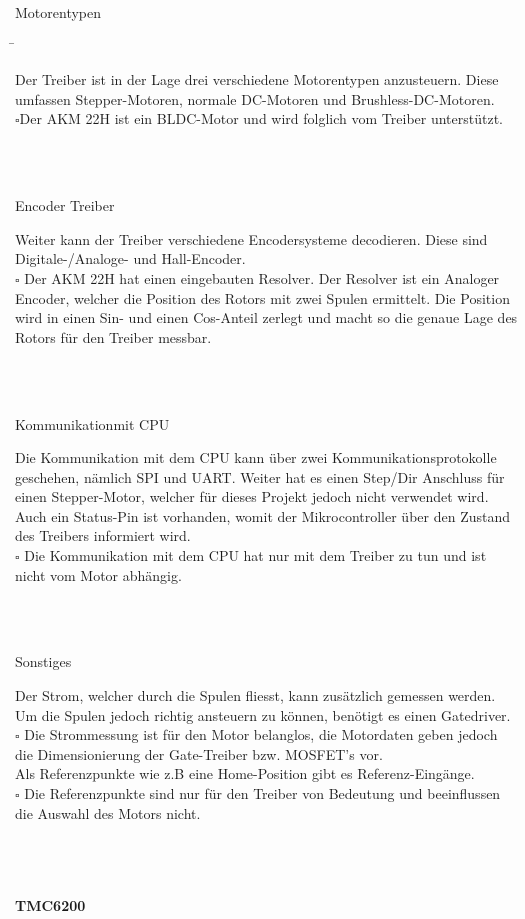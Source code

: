 \begin{tabbing}
\parbox[t]{.25\textwidth}{Motorentypen} \= \parbox[t]{.75\textwidth}{\textbullet Der Treiber ist in der Lage drei verschiedene Motorentypen anzusteuern.
Diese umfassen Stepper-Motoren, normale DC-Motoren und Brushless-DC-Motoren.\\

$\square$Der AKM 22H ist ein BLDC-Motor und wird folglich vom Treiber unterstützt.}\\
\\
\parbox[t]{.25\textwidth}{Encoder Treiber} \> \parbox[t]{.75\textwidth}{\textbullet Weiter kann der  Treiber verschiedene Encodersysteme decodieren.
Diese sind Digitale-/Analoge- und Hall-Encoder.\\

$\square$ Der AKM 22H hat einen eingebauten Resolver. Der Resolver ist ein Analoger Encoder, welcher die Position des Rotors mit zwei Spulen ermittelt. Die Position wird in einen Sin- und einen Cos-Anteil zerlegt und macht so die genaue Lage des Rotors für den Treiber messbar.}\\
\\
\parbox[t]{.25\textwidth}{Kommunikation\newline mit CPU} \>\parbox[t]{.75\textwidth}{\textbullet Die Kommunikation mit dem CPU kann über zwei Kommunikationsprotokolle geschehen, nämlich SPI und UART. Weiter hat es einen Step/Dir Anschluss für einen Stepper-Motor, welcher für dieses Projekt jedoch nicht verwendet wird. Auch ein Status-Pin ist vorhanden, womit der Mikrocontroller über den Zustand des Treibers informiert wird.\\

$\square$ Die Kommunikation mit dem CPU hat nur mit dem Treiber zu tun und ist nicht vom Motor abhängig.}\\
\\
\parbox[t]{.25\textwidth}{Sonstiges} \>\parbox[t]{.75\textwidth}{\textbullet Der Strom, welcher durch die Spulen fliesst, kann zusätzlich gemessen werden. Um die Spulen jedoch richtig ansteuern zu können, benötigt es einen Gatedriver.\\

$\square$ Die Strommessung ist für den Motor belanglos, die Motordaten geben jedoch die Dimensionierung der Gate-Treiber bzw. MOSFET's vor.\\

\textbullet Als Referenzpunkte wie z.B eine Home-Position gibt es Referenz-Eingänge.\\

$\square$ Die Referenzpunkte sind nur für den Treiber von Bedeutung und beeinflussen die Auswahl des Motors nicht.}\\
\\
\end{tabbing}

\paragraph{TMC6200}\label{par:Anforderungen_TMC6200}\mbox{}\\

